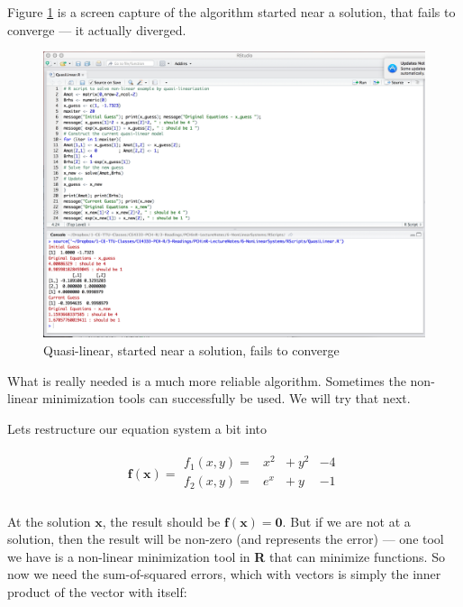 Figure \ref{fig:QuasiLinear-Fail1} is a screen capture of the algorithm started near a solution, that fails to converge --- it actually diverged.

\begin{figure}[h!] %
   \centering
   \includegraphics[width=6in]{./6-NonLinearSystems/QuasiLinear-Fail1.jpg} 
   \caption{Quasi-linear, started near a solution, fails to converge}
   \label{fig:QuasiLinear-Fail1}
\end{figure}

What is really needed is a much more reliable algorithm.  
Sometimes the non-linear minimization tools can successfully be used.  
We will try that next.

Lets restructure our equation system a bit into

\begin{gather}
\mathbf{f(x)} = 
\begin{matrix}
f_1(x,y) = & x^2 & +~y^2 & - 4\\
f_2(x,y) = & e^x & +~y  & - 1\\
\end{matrix}
\end{gather}

At the solution $\mathbf{x}$, the result should be $\mathbf{f(x) = 0}$.  
But if we are not at a solution, then the result will be non-zero (and represents the error) --- one tool we have is a non-linear minimization tool in \textbf{R} that can minimize functions.  
So now we need the sum-of-squared errors, which with vectors is simply the inner product of the vector with itself:

